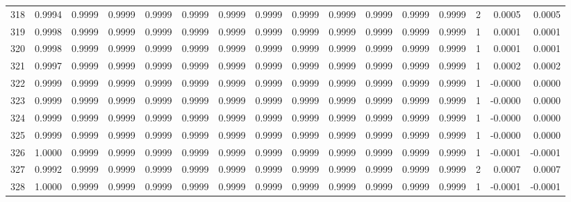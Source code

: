 \begin{tabular}{lrrrrrrrrrrrrrrr}
318 &      0.9994 &  0.9999 &  0.9999 &  0.9999 &  0.9999 &  0.9999 &  0.9999 &  0.9999 &  0.9999 &  0.9999 &   0.9999 &     0.9999 &      2 &                    0.0005 &                     0.0005 \\
319 &      0.9998 &  0.9999 &  0.9999 &  0.9999 &  0.9999 &  0.9999 &  0.9999 &  0.9999 &  0.9999 &  0.9999 &   0.9999 &     0.9999 &      1 &                    0.0001 &                     0.0001 \\
320 &      0.9998 &  0.9999 &  0.9999 &  0.9999 &  0.9999 &  0.9999 &  0.9999 &  0.9999 &  0.9999 &  0.9999 &   0.9999 &     0.9999 &      1 &                    0.0001 &                     0.0001 \\
321 &      0.9997 &  0.9999 &  0.9999 &  0.9999 &  0.9999 &  0.9999 &  0.9999 &  0.9999 &  0.9999 &  0.9999 &   0.9999 &     0.9999 &      1 &                    0.0002 &                     0.0002 \\
322 &      0.9999 &  0.9999 &  0.9999 &  0.9999 &  0.9999 &  0.9999 &  0.9999 &  0.9999 &  0.9999 &  0.9999 &   0.9999 &     0.9999 &      1 &                   -0.0000 &                     0.0000 \\
323 &      0.9999 &  0.9999 &  0.9999 &  0.9999 &  0.9999 &  0.9999 &  0.9999 &  0.9999 &  0.9999 &  0.9999 &   0.9999 &     0.9999 &      1 &                   -0.0000 &                     0.0000 \\
324 &      0.9999 &  0.9999 &  0.9999 &  0.9999 &  0.9999 &  0.9999 &  0.9999 &  0.9999 &  0.9999 &  0.9999 &   0.9999 &     0.9999 &      1 &                   -0.0000 &                     0.0000 \\
325 &      0.9999 &  0.9999 &  0.9999 &  0.9999 &  0.9999 &  0.9999 &  0.9999 &  0.9999 &  0.9999 &  0.9999 &   0.9999 &     0.9999 &      1 &                   -0.0000 &                     0.0000 \\
326 &      1.0000 &  0.9999 &  0.9999 &  0.9999 &  0.9999 &  0.9999 &  0.9999 &  0.9999 &  0.9999 &  0.9999 &   0.9999 &     0.9999 &      1 &                   -0.0001 &                    -0.0001 \\
327 &      0.9992 &  0.9999 &  0.9999 &  0.9999 &  0.9999 &  0.9999 &  0.9999 &  0.9999 &  0.9999 &  0.9999 &   0.9999 &     0.9999 &      2 &                    0.0007 &                     0.0007 \\
328 &      1.0000 &  0.9999 &  0.9999 &  0.9999 &  0.9999 &  0.9999 &  0.9999 &  0.9999 &  0.9999 &  0.9999 &   0.9999 &     0.9999 &      1 &                   -0.0001 &                    -0.0001 \\

\end{tabular}
